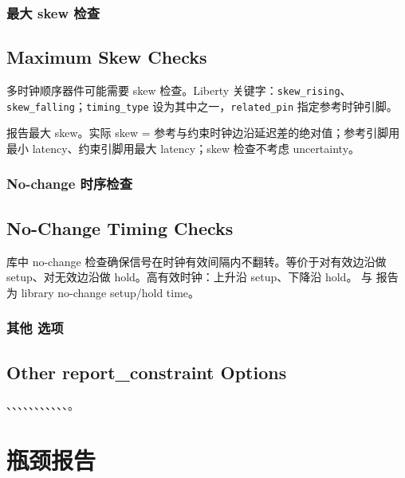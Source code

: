 \subsubsection{最大 skew 检查}
\subsection*{Maximum Skew Checks}

多时钟顺序器件可能需要 skew 检查。Liberty 关键字：\texttt{skew\_rising}、\texttt{skew\_falling}；\texttt{timing\_type} 设为其中之一，\texttt{related\_pin} 指定参考时钟引脚。


 报告最大 skew。实际 skew = 参考与约束时钟边沿延迟差的绝对值；参考引脚用最小 latency、约束引脚用最大 latency；skew 检查不考虑 uncertainty。

\subsubsection{No-change 时序检查}
\subsection*{No-Change Timing Checks}

库中 no-change 检查确保信号在时钟有效间隔内不翻转。等价于对有效边沿做 setup、对无效边沿做 hold。高有效时钟：上升沿 setup、下降沿 hold。 与  报告为 library no-change setup/hold time。

\subsubsection{其他  选项}
\subsection*{Other report\_constraint Options}

、、、、、、、、、、、。

\section{瓶颈报告}
